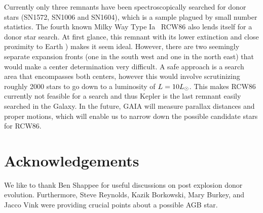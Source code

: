 \documentclass[preprint2]{aastex}
\begin{document}
Currently only three remnants have been spectroscopically searched for donor stars (SN1572, SN1006 and SN1604), which is a sample plagued by small number statistics. The fourth known Milky Way Type Ia \snr~RCW86 also lends itself for a donor star search. At first glance, this remnant with its lower extinction \citep[$A_V \approx 1.7$;][]{1983MNRAS.204..273L} and close proximity to Earth \citep[$d=2.5~\kpc$; ][]{2011ApJ...741...96W}) makes it seem ideal. However, there are two seemingly separate expansion fronts (one in the south west and one in the north east) that would make a center determination very difficult. A safe approach is a search area that encompasses both centers, however this would involve scrutinizing roughly 2000 stars to go down to a luminosity of $L=10\hbox{$L_{\odot}$}$. This makes RCW86 currently not feasible for a search and thus Kepler is the last remnant easily searched in the Galaxy. In the future, GAIA will measure parallax distances and proper motions, which will enable us to narrow down the possible candidate stars for RCW86.



\section{Acknowledgements}

We like to thank Ben Shappee for useful discussions on post explosion donor evolution. Furthermore, Steve Reynolds, Kazik Borkowski, Mary Burkey, and Jacco Vink were providing crucial points about a possible AGB star. 



\end{document}
